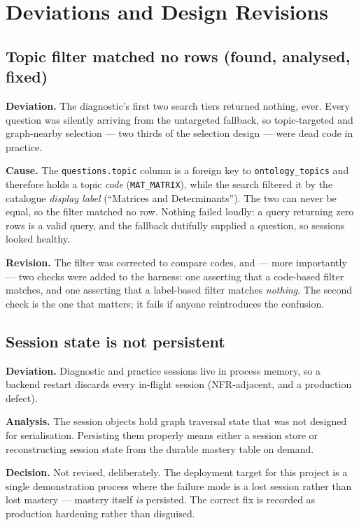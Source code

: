 \section{Deviations and Design Revisions}
\label{sec:revisions}

\subsection{Topic filter matched no rows (found, analysed, fixed)}

\textbf{Deviation.} The diagnostic's first two search tiers returned nothing,
ever. Every question was silently arriving from the untargeted fallback, so
topic-targeted and graph-nearby selection --- two thirds of the selection design
--- were dead code in practice.

\textbf{Cause.} The \texttt{questions.topic} column is a foreign key to
\texttt{ontology\_topics} and therefore holds a topic \emph{code}
(\texttt{MAT\_MATRIX}), while the search filtered it by the catalogue
\emph{display label} (``Matrices and Determinants''). The two can never be
equal, so the filter matched no row. Nothing failed loudly: a query returning
zero rows is a valid query, and the fallback dutifully supplied a question, so
sessions looked healthy.

\textbf{Revision.} The filter was corrected to compare codes, and --- more
importantly --- two checks were added to the harness: one asserting that a
code-based filter matches, and one asserting that a label-based filter matches
\emph{nothing}. The second check is the one that matters; it fails if anyone
reintroduces the confusion.

\subsection{Session state is not persistent}
\label{sec:deviations-session}

\textbf{Deviation.} Diagnostic and practice sessions live in process memory, so
a backend restart discards every in-flight session (NFR-adjacent, and a
production defect).

\textbf{Analysis.} The session objects hold graph traversal state that was not
designed for serialisation. Persisting them properly means either a session
store or reconstructing session state from the durable mastery table on demand.

\textbf{Decision.} Not revised, deliberately. The deployment target for this
project is a single demonstration process where the failure mode is a lost
session rather than lost mastery --- mastery itself \emph{is} persisted. The
correct fix is recorded as production hardening rather than disguised.

